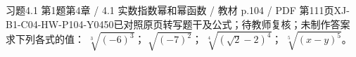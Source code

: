 \par\noindent\begin{minipage}{\linewidth}
\begin{bankitem}{习题4.1 第1题}{第4章 / 4.1 实数指数幂和幂函数 / 教材 p.104 / PDF 第111页}{XJ-B1-C04-HW-P104-Y0450}{已对照原页转写题干及公式；待教师复核；未制作答案}
求下列各式的值：
$\sqrt[3]{(-6)^3}$；
$\sqrt{(-7)^2}$；
$\sqrt[4]{(\sqrt2-2)^4}$；
$\sqrt[5]{(x-y)^5}$。
\end{bankitem}
\end{minipage}\par\medskip
